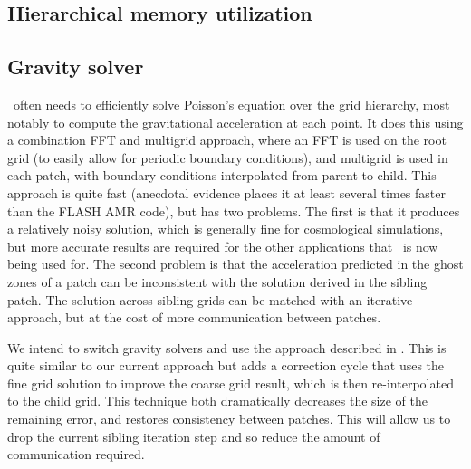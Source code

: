 \documentclass{article}
\begin{document}
\subsection{Hierarchical memory utilization} \label{issue:memory-hierarchy-use}

\vspace{2in}

\subsection{Gravity solver} \label{issue:method-gravity}


  \enzo\ often needs to efficiently solve Poisson's equation over the
  grid hierarchy, most notably to compute the gravitational
  acceleration at each point.  It does this using a combination FFT
  and multigrid approach, where an FFT is used on the root grid (to
  easily allow for periodic boundary conditions), and multigrid is
  used in each patch, with boundary conditions interpolated from
  parent to child.  This approach is quite fast (anecdotal evidence
  places it at least several times faster than the FLASH AMR code),
  but has two problems.  The first is that it produces a relatively
  noisy solution, which is generally fine for cosmological
  simulations, but more accurate results are required for the other
  applications that \enzo\  is now being used for.  The second problem is
  that the acceleration predicted in the ghost zones of a patch can be
  inconsistent with the solution derived in the sibling patch.  The
  solution across sibling grids can be matched with an iterative
  approach, but at the cost of more communication between patches. 

  We intend to switch gravity solvers and use the approach described
  in \cite{hg00}.  This is quite similar to our current approach but
  adds a correction cycle that uses the fine grid solution to improve
  the coarse grid result, which is then re-interpolated to the child
  grid.  This technique both dramatically decreases the size of the
  remaining error, and restores consistency between patches.  This
  will allow us to drop the current sibling iteration step and so
  reduce the amount of communication required.
\end{document}
